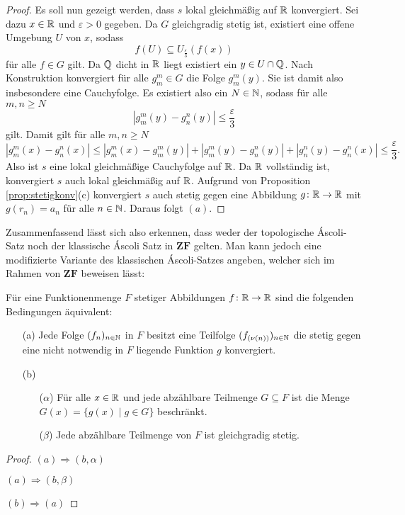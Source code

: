 \begin{proof}
  Es soll nun gezeigt werden, dass $s$ lokal gleichmäßig auf $\mathbb{R}$ konvergiert.
  Sei dazu $x \in \mathbb{R}$ und $\varepsilon > 0$ gegeben.
  Da $G$ gleichgradig stetig ist, existiert eine offene Umgebung $U$ von $x$, sodass
  \begin{displaymath}
    f(U) \subseteq U_\frac{\varepsilon}{3}(f(x))
  \end{displaymath}
  für alle $f \in G$ gilt.
  Da $\mathbb{Q}$ dicht in $\mathbb{R}$ liegt existiert ein $y \in U \cap \mathbb{Q}$.
  Nach Konstruktion konvergiert für alle $g_m^m \in G$ die Folge $g_m^m(y)$.
  Sie ist damit also insbesondere eine Cauchyfolge.
  Es existiert also ein $N \in \mathbb{N}$, sodass für alle $m,n \geq N$
  \begin{displaymath}
    | g_m^m(y) - g_n^n(y) | \leq \frac{\varepsilon}{3}
  \end{displaymath}
  gilt.
  Damit gilt für alle $m, n \geq N$
  \begin{displaymath}
    | g_m^m(x) - g_n^n(x) |
    \leq 
    | g_m^m(x) - g_m^m(y) | +  | g_m^m(y) - g_n^n(y) | +  | g_n^n(y) - g_n^n(x) |
    \leq
    \frac{\varepsilon}{3}.
  \end{displaymath}
  Also ist $s$ eine lokal gleichmäßige Cauchyfolge auf $\mathbb{R}$.
  Da $\mathbb{R}$ vollständig ist, konvergiert $s$ auch lokal gleichmäßig auf $\mathbb{R}$. 
  Aufgrund von Proposition \ref{prop:stetigkonv}(c) konvergiert $s$ auch stetig gegen eine Abbildung $g \colon \mathbb{R} \to \mathbb{R}$ mit $g(r_n) = a_n$ für alle $n \in \mathbb{N}$.
  Daraus folgt $(a)$.
\end{proof}

Zusammenfassend lässt sich also erkennen, dass weder der topologische Áscoli-Satz noch der klassische Áscoli Satz in $\mathbf{ZF}$ gelten. Man kann jedoch eine modifizierte Variante des klassischen Áscoli-Satzes angeben, welcher sich im Rahmen von $\mathbf{ZF}$ beweisen lässt:

\begin{thm}
  Für eine Funktionenmenge $F$ stetiger Abbildungen $f \colon \mathbb{R} \to \mathbb{R}$ sind die folgenden Bedingungen äquivalent:
  \begin{itemize}

    \item[(a)] Jede Folge $(f_n)_{n \in \mathbb{N}}$ in $F$ besitzt eine Teilfolge $(f_{(\nu(n))})_{n \in \mathbb{N}}$ die stetig gegen eine nicht notwendig in $F$ liegende Funktion $g$ konvergiert.

    \item[(b)]
      \begin{itemize}
        \item[($\alpha$)] Für alle $x \in \mathbb{R}$ und jede abzählbare Teilmenge $G \subseteq F$ ist die Menge $G(x) = \{ g(x) \mid g \in G \}$ beschränkt.
        \item[($\beta$)] Jede abzählbare Teilmenge von $F$ ist gleichgradig stetig.
      \end{itemize}
  \end{itemize}
\end{thm}

\begin{proof}
  $(a) \Rightarrow (b,\alpha)$

  $(a) \Rightarrow (b,\beta)$

  $(b) \Rightarrow (a)$
\end{proof}
